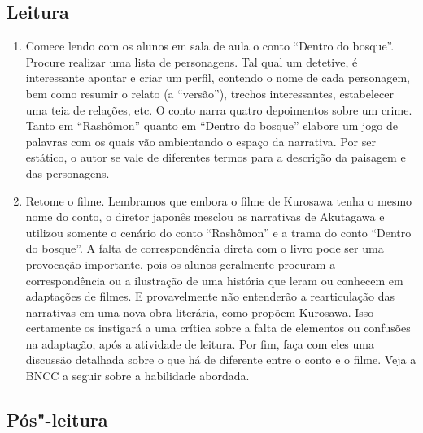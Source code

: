 \documentclass[12pt]{extarticle}
\begin{document}
 


\subsection{Leitura}

\begin{enumerate} 

\item Comece lendo com os alunos em sala de aula o
conto ``Dentro do bosque''.  Procure realizar uma lista de personagens.
Tal qual um detetive, é interessante apontar e criar um perfil, contendo
o nome de cada personagem, bem como resumir o relato (a ``versão''),
trechos interessantes, estabelecer uma teia de relações, etc.  O conto
narra quatro depoimentos sobre um crime. Tanto em ``Rashômon'' quanto em
``Dentro do bosque'' elabore um jogo de palavras com os quais vão ambientando
o espaço da narrativa. Por ser estático, o autor se vale de diferentes
termos para a descrição da paisagem e das personagens. 



\item Retome o filme. Lembramos que embora o filme de Kurosawa tenha o mesmo
nome do conto, o diretor japonês mesclou as narrativas de Akutagawa e
utilizou somente o cenário do conto ``Rashômon'' e a trama do conto ``Dentro 
do bosque''. A falta de correspondência direta com o livro pode ser uma
provocação importante, pois os alunos geralmente procuram a correspondência
ou a ilustração de uma história que leram ou conhecem em adaptações de
filmes. E provavelmente não entenderão a rearticulação das narrativas em
uma nova obra literária, como propõem Kurosawa. Isso certamente os
instigará a uma crítica sobre a falta de elementos ou confusões na
adaptação, após a atividade de leitura. Por fim, faça com eles uma
discussão detalhada sobre o que há de diferente entre o conto e o filme. 
Veja a BNCC a seguir sobre a habilidade abordada.

\end{enumerate}
 

\subsection{Pós"-leitura}
\end{document}
